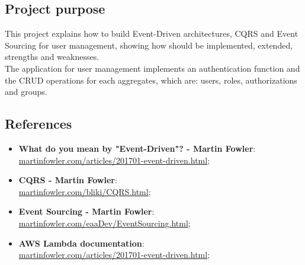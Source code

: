 \subsection{Project purpose}
This project explains how to build Event-Driven architectures, CQRS and Event Sourcing for user management, showing how should be implemented, extended, strengths and weaknesses.\\
The application for user management implements an authentication function and the CRUD operations for each aggregates, which are: users, roles, authorizations and groups.

\subsection{References}
\begin{itemize}
	\item \textbf{What do you mean by "Event-Driven"? - Martin Fowler}:\\ \url{martinfowler.com/articles/201701-event-driven.html};
	\item \textbf{CQRS - Martin Fowler}:\\ \url{martinfowler.com/bliki/CQRS.html};
	\item \textbf{Event Sourcing - Martin Fowler}:\\ \url{martinfowler.com/eaaDev/EventSourcing.html};
	\item \textbf{AWS Lambda documentation}:\\ \url{martinfowler.com/articles/201701-event-driven.html};
\end{itemize}
\pagebreak
